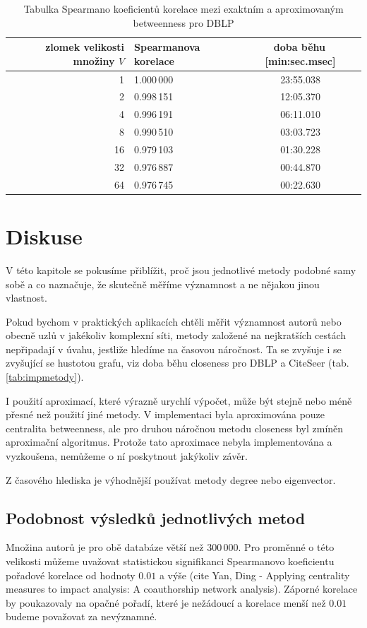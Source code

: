 \documentclass{bakalarka}
\begin{document}
\begin{table}[!ht]
\centering
\caption{Tabulka Spearmano koeficientů korelace mezi exaktním a aproximovaným betweenness pro DBLP}
\label{tab:btwA}
\begin{tabular}{r|l|c}
\toprule
zlomek velikosti množiny $V$ & Spearmanova korelace & doba běhu\,[min:sec.msec] \\
\midrule
1  & 1.000\,000 & 23:55.038\\
2  & 0.998\,151 & 12:05.370\\
4  & 0.996\,191 & 06:11.010\\
8  & 0.990\,510 & 03:03.723\\
16 & 0.979\,103 & 01:30.228\\
32 & 0.976\,887 & 00:44.870\\
64 & 0.976\,745 & 00:22.630\\
\bottomrule
\end{tabular}
\end{table}

\chapter{Diskuse}
V této kapitole se pokusíme přiblížit, proč jsou jednotlivé metody podobné samy
sobě a co naznačuje, že skutečně měříme významnost a ne nějakou jinou
vlastnost. 

Pokud bychom v praktických aplikacích chtěli měřit významnost autorů nebo
obecně uzlů v jakékoliv komplexní síti, metody založené na nejkratších cestách
nepřipadají v úvahu, jestliže hledíme na časovou náročnost. Ta se zvyšuje i se
zvyšující se hustotou grafu, viz doba běhu closeness pro DBLP a CiteSeer (tab.
\ref{tab:impmetody}).

I použití aproximací, které výrazně urychlí výpočet, může být stejně nebo méně
přesné než použití jiné metody. V implementaci byla aproximována pouze
centralita betweenness, ale pro druhou náročnou metodu closeness byl zmíněn
aproximační algoritmus. Protože tato aproximace nebyla implementována a
vyzkoušena, nemůžeme o ní poskytnout jakýkoliv závěr.

Z časového hlediska je výhodnější používat metody degree nebo eigenvector.

\section{Podobnost výsledků jednotlivých metod}
Množina autorů je pro obě databáze větší než 300\,000. Pro proměnné o této
velikosti můžeme uvažovat statistickou signifikanci Spearmanovo koeficientu
pořadové korelace od hodnoty $0.01$ a výše (cite Yan, Ding - Applying
centrality measures to impact analysis: A coauthorship network analysis).
Záporné korelace by poukazovaly na opačné pořadí, které je nežádoucí a korelace
menší než $0.01$ budeme považovat za nevýznamné.
\end{document}
